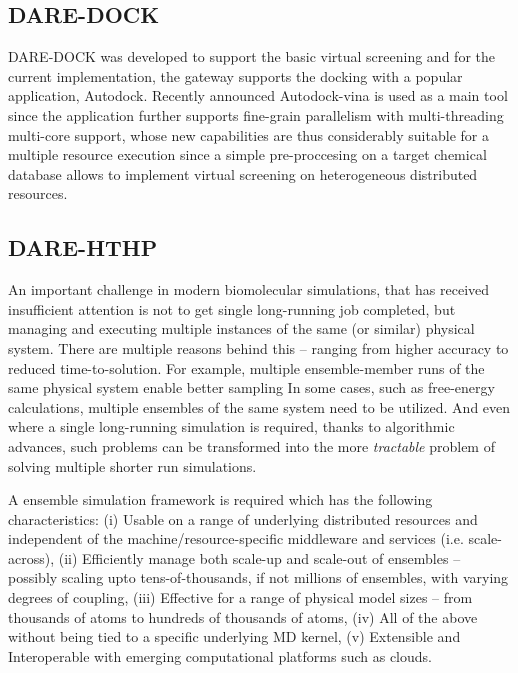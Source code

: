 \documentclass{sig-alternate}
\begin{document}
\subsection{DARE-DOCK}
DARE-DOCK was developed to support the basic virtual screening and for the current implementation, the gateway supports the docking with a popular application, Autodock\cite{autodock}.  Recently announced Autodock-vina is used as a main tool since the application further supports fine-grain parallelism with multi-threading multi-core support, whose new capabilities are thus considerably suitable for a multiple resource execution since a simple pre-proccesing on a target chemical database allows to implement virtual screening on heterogeneous distributed resources\cite{autodock-vina}.  

%

\subsection{DARE-HTHP}

An important challenge in modern biomolecular simulations, that has
received insufficient attention is not to get single long-running job
completed, but managing and executing multiple instances of the same
(or similar) physical system.  There are multiple reasons behind this
-- ranging from higher accuracy to reduced time-to-solution. For
example, multiple ensemble-member runs of the same physical system
enable better sampling In some cases, such as free-energy
calculations, multiple ensembles of the same system need to be
utilized. And even where a single long-running simulation is required,
thanks to algorithmic advances, such problems can be transformed into
the more {\it tractable} problem of solving multiple shorter run
simulations.



A ensemble simulation framework is required which has the following
characteristics: (i) Usable on a range of underlying distributed
resources and independent of the machine/resource-specific middleware
and services (i.e. scale-across), (ii) Efficiently manage both
scale-up and scale-out of ensembles -- possibly scaling upto
tens-of-thousands, if not millions of ensembles, with varying degrees
of coupling, (iii) Effective for a range of physical model sizes --
from thousands of atoms to hundreds of thousands of atoms, (iv) All of
the above without being tied to a specific underlying MD kernel, (v)
Extensible and Interoperable with emerging computational platforms such
as clouds.
\end{document}
